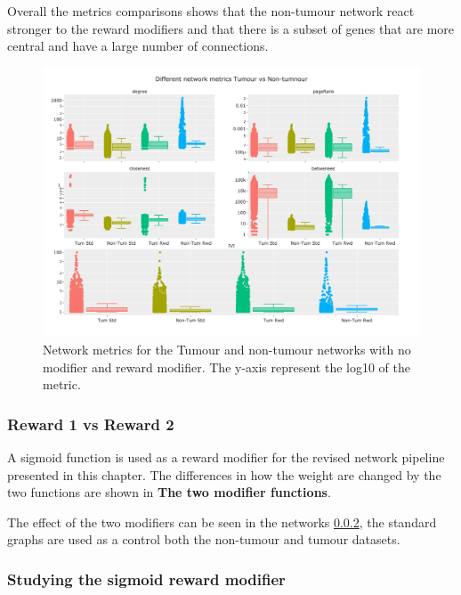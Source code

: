Overall the metrics comparisons shows that the non-tumour network react stronger to the reward modifiers and that there is a subset of genes that are more central and have a large number of connections.

\begin{figure}[H]    
    \centering
    \includegraphics[width=1.0\textwidth,height=0.7\textheight,keepaspectratio]{Sections/Network_II/validation/network_comparison.png}
    \caption{Network metrics for the Tumour and non-tumour networks with no modifier and reward modifier. The y-axis represent the log10 of the metric. }
    \label{fig:N_II:net_metrics_comp}
\end{figure}

\subsubsection{Reward 1 vs Reward 2}

A sigmoid function is used as a reward modifier for the revised network pipeline presented in this chapter. The differences in how the weight are changed by the two functions are shown in \textbf{The two modifier functions}. 

The effect of the two modifiers can be seen in the networks \ref{}, the standard graphs are used as a control both the non-tumour and tumour datasets.


\subsubsection{Studying the sigmoid reward modifier}

